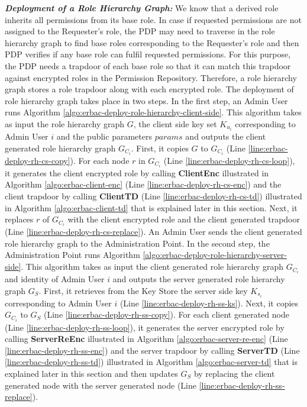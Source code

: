 \documentclass[epsfig,a4paper,11pt,titlepage]{book}
\numberwithin{algorithm}{chapter}
\begin{document}
\noindent \emph{\textbf{Deployment of a Role Hierarchy Graph:}} 
We know that a derived role inherits all permissions from its base role. In case if requested permissions are not assigned to the Requester's role, the \gls{PDP} may need to traverse in the role hierarchy graph to find base roles corresponding to the Requester's role and then \gls{PDP} verifies if any base role can fulfil requested permissions. For this purpose, the \gls{PDP} needs a trapdoor of each base role so that it can match this trapdoor against encrypted roles in the Permission Repository. Therefore, a role hierarchy graph stores a role trapdoor along with each encrypted role. The deployment of role hierarchy graph takes place in two steps. In the first step, an Admin User runs Algorithm \ref{algo:erbac-deploy-role-hierarchy-client-side}. This algorithm takes as input the role hierarchy graph $G$, the client side key set $K_{u_i}$ corresponding to Admin User $i$ and the public parameters $params$ and outputs the client generated role hierarchy graph $G_{C_i}$. First, it copies $G$ to $G_{C_i}$  (Line \ref{line:erbac-deploy-rh-cs-copy}). For each node $r$ in $G_{C_i}$ (Line \ref{line:erbac-deploy-rh-cs-loop}), it generates the client encrypted role by calling \textbf{ClientEnc} illustrated in Algorithm \ref{algo:erbac-client-enc} (Line \ref{line:erbac-deploy-rh-cs-enc}) and the client trapdoor by calling \textbf{ClientTD} (Line \ref{line:erbac-deploy-rh-cs-td}) illustrated in Algorithm \ref{algo:erbac-client-td} that is explained later in this section. Next, it replaces $r$ of $G_{C_i}$ with the client encrypted role and the client generated trapdoor (Line \ref{line:erbac-deploy-rh-cs-replace}). An Admin User sends the client generated role hierarchy graph to the Administration Point. 
In the second step, the Administration Point runs Algorithm \ref{algo:erbac-deploy-role-hierarchy-server-side}. This algorithm takes as input the client generated role hierarchy graph $G_{C_i}$ and identity of Admin User $i$ and outputs the server generated role hierarchy graph $G_{S}$. First, it retrieves from the Key Store the server side key $K_{s_i}$ corresponding to Admin User $i$ (Line \ref{line:erbac-deploy-rh-ss-ks}). Next, it copies $G_{C_i}$ to $G_{S}$ (Line \ref{line:erbac-deploy-rh-ss-copy}). For each client generated node (Line \ref{line:erbac-deploy-rh-ss-loop}), it generates the server encrypted role by calling \textbf{ServerReEnc} illustrated in Algorithm \ref{algo:erbac-server-re-enc} (Line \ref{line:erbac-deploy-rh-ss-enc}) and the server trapdoor by calling \textbf{ServerTD} (Line \ref{line:erbac-deploy-rh-ss-td}) illustrated in Algorithm \ref{algo:erbac-server-td} that is explained later in this section and then updates $G_{S}$ by replacing the client generated node with the server generated node (Line \ref{line:erbac-deploy-rh-ss-replace}). 
\end{document}
